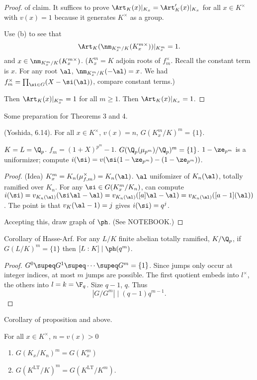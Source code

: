 \begin{proof} of claim.
It suffices to prove $\Art_K(x)|_{K_x}=\Art'_K(x)|_{K_x}$ for all $x\in K^{\times}$ with $v(x)=1$ because it generates $K^{\times}$ as a group. %

Use (b) to see that
\[
\Art_K(\nm_{K_x^m/K}(K_x^{m\times}))|_{K_x^m}=1.
\]
and
$x\in \nm_{K_x^m/K}(K_x^{m\times})$. ($K_x^m=K$ adjoin roots of $f_m^{\times}$. Recall the constant term is $x$. For any root $\al$, $\nm_{K_x^m/K}(-\al)=x$. We had $f_m^{\times}=\prod_{\si\in G} (X-\si(\al))$, compare constant terms.)

Then $\Art_K(x)|_{K_x^m}=1$ for all $m\ge 1$. Then $\Art_K(x)|_{K_x}=1$.
\end{proof}
Some preparation for Theorems 3 and 4.
\begin{pr}
(Yoshida, 6.14). For all $x\in K^{\times}$, $v(x)=n$, $G(K_x^m/K)^m=\{1\}$.
\end{pr}
\begin{ex}
$K=L=\Q_p$. $f_m=(1+X)^{p^m}-1$. $G(\Q_p(\mu_{p^m})/\Q_p)^m=\{1\}$. $1-\ze_{p^m}$ is a uniformizer; compute $i(\si)=v(\si(1-\ze_{p^m})-(1-\ze_{p^m}))$. 
\end{ex}
\begin{proof}
(Idea) %
$K_x^{m}=K_n(\mu_{f,m}^{\times})=K_n(\al)$. $\al$ unifomizer of $K_n(\al)$, totally ramified over $K_n$. For any $\si\in G(K_x^m/K_n)$, %
can compute $i(\si)=v_{K_n(\al)}(\si\al-\al)=v_{K_n(\al)}([a]\al-\al)=v_{K_n(\al)}([a-1](\al))$. The point is that $v_K(\al-1)=j$ gives $i(\si)=q^j$. 

Accepting this, draw graph of $\ph$. (See NOTEBOOK.)
\end{proof}
\begin{pr}
Corollary of Hasse-Arf. For any $L/K$ finite abelian totally ramified, $K/\Q_p$, if $G(L/K)^m=\{1\}$ then $[L:K]\mid \ph(q^m)$.
\end{pr} 
\begin{proof}
$G^0\supeq G^1\supeq\cdots \supeq G^m=\{1\}$. Since jumps only occur at integer indices, at most $m$ jumps are possible. The first quotient embeds into $l^{\times}$, the others into $l=k=\F_q$. Size $q-1$, $q$. Thus
\[
|G/G^m|\mid (q-1)q^{m-1}.
\] 
\end{proof}
Corollary of proposition and above. 
\begin{cor}
For all $x\in K^{\times}$, $n=v(x)>0$
\begin{enumerate}
\item
$G(K_{x}/K_n)^m=G(K_x^m)$
\item
$G(K^{\text{LT}}/K)^m=G(K^{\text{LT}}/K^m)$.
\end{enumerate}
\end{cor}
